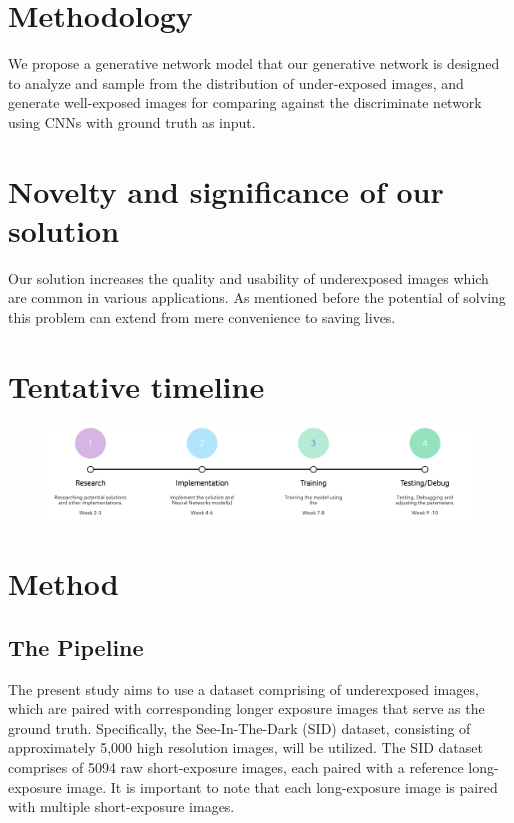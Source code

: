 \documentclass{article}
\begin{document}
\section{Methodology}
We propose a generative network model that our generative network is designed to analyze and sample from the distribution of under-exposed images, and generate well-exposed images for comparing against the discriminate network using CNNs with ground truth as input. 
\section{Novelty and significance of our solution}
Our solution increases the quality and usability of underexposed images which are common in various applications. As mentioned before the potential of solving this problem can extend from mere convenience to saving lives.
\section{Tentative timeline}
\begin{figure}[h]
  \centering
  \includegraphics[width=\textwidth]{timeline.png}
\end{figure}

\section{Method}
\subsection{The Pipeline}
The present study aims to use a dataset comprising of underexposed images, which are paired with corresponding longer exposure images that serve as the ground truth. Specifically, the See-In-The-Dark (SID) dataset, consisting of approximately 5,000 high resolution images, will be utilized. The SID dataset comprises of 5094 raw short-exposure images, each paired with a reference long-exposure image. It is important to note that each long-exposure image is paired with multiple short-exposure images. 
\end{document}

